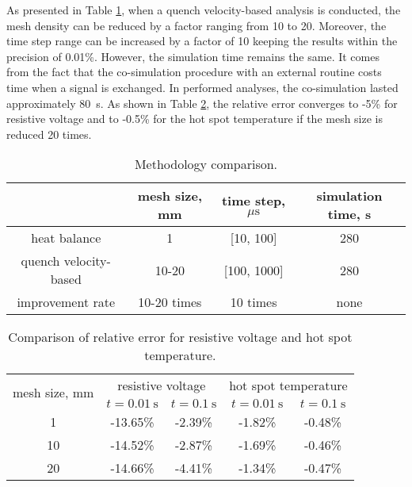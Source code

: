 As presented in Table \ref{table: 1d_qv_benchmarking_no_insulation_methods_comparison}, when a quench velocity-based analysis is conducted, the mesh density can be reduced by a factor ranging from 10 to 20. Moreover, the time step range can be increased by a factor of 10 keeping the results within the precision of 0.01\%. However, the simulation time remains the same. It comes from the fact that the co-simulation procedure with an external routine costs time when a signal is exchanged. In performed analyses, the co-simulation lasted approximately 80~s. As shown in Table \ref{table: 1d_qv_benchmarking_no_insulation_res_and_hot_spot_error_conclusion}, the relative error converges to -5\% for resistive voltage and to -0.5\% for the hot spot temperature if the mesh size is reduced 20 times.

\begin{table}[H]
    \caption{Methodology comparison.} 
    \vspace{-1.em} 
    \fontsize{10}{10}
    \selectfont 
    \renewcommand{\arraystretch}{1.5}
    \begin{center}
        \begin{tabular}{ cccc }  
        \hline
          & mesh size, mm & time step, $\mu \text{s}$ & simulation time, s\\
        \hline
        heat balance & 1 & [10, 100] & 280 \\
        quench velocity-based & 10-20 & [100, 1000] & 280 \\
        \hline 
        improvement rate & 10-20 times & 10 times & none\\
        \end{tabular}
    \end{center}  
     \label{table: 1d_qv_benchmarking_no_insulation_methods_comparison} 
 \end{table}
 
 \begin{table}[H]
    \caption{Comparison of relative error for resistive voltage and hot spot temperature.} 
    \vspace{-1.em} 
    \fontsize{10}{10}
    \selectfont 
    \renewcommand{\arraystretch}{1.5}
    \begin{center}
        \begin{tabular}{ c | cc | cc }  
        \hline
        \multirow{2}{*}{mesh size, mm} & \multicolumn{2}{c|}{resistive voltage} & \multicolumn{2}{c}{hot spot temperature} \\ 
           & $t=0.01~\text{s}$ & $t=0.1~\text{s}$ & $t=0.01~\text{s}$ & $t=0.1~\text{s}$ \\
        \hline
        1 & -13.65\% & -2.39\% & -1.82\% & -0.48\% \\
        10 & -14.52\% & -2.87\% & -1.69\% & -0.46\% \\
        20 & -14.66\% & -4.41\% & -1.34\% & -0.47\% \\
        \hline 
        \end{tabular}
    \end{center}  
     \label{table: 1d_qv_benchmarking_no_insulation_res_and_hot_spot_error_conclusion} 
 \end{table}